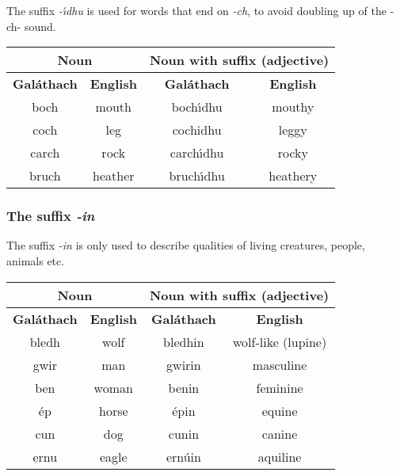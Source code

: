 The suffix \textit{-\'{\i}dhu} is used for words that end on \textit{-ch}, to avoid doubling up of the -ch- sound.
\begin{table}[H]
\centering
\begin{tabular}{cccc}
  \toprule
  \multicolumn{2}{c}{\textbf{Noun}} & \multicolumn{2}{c}{\textbf{Noun with suffix (adjective)}}\\
  \midrule
  \textbf{Gal\'{a}thach} & \textbf{English} & \textbf{Gal\'{a}thach} & \textbf{English}\\
  \cmidrule(lr){1-1}\cmidrule(lr){2-2}\cmidrule(lr){3-3}\cmidrule(lr){4-4}
  boch & mouth & boch\'{\i}dhu & mouthy\\
  coch & leg & cochidhu & leggy\\
  carch & rock & carch\'{\i}dhu & rocky\\
  bruch & heather & bruch\'{\i}dhu & heathery\\
  \bottomrule
\end{tabular}
\label{examples_suffix_iidhu}
\end{table}

\subsubsection{The suffix \textit{-in}}

The suffix \textit{-in} is only used to describe qualities of living creatures, people, animals etc.
\begin{table}[H]
\centering
\begin{tabular}{cccc}
  \toprule
  \multicolumn{2}{c}{\textbf{Noun}} & \multicolumn{2}{c}{\textbf{Noun with suffix (adjective)}}\\
  \midrule
  \textbf{Gal\'{a}thach} & \textbf{English} & \textbf{Gal\'{a}thach} & \textbf{English}\\
  \cmidrule(lr){1-1}\cmidrule(lr){2-2}\cmidrule(lr){3-3}\cmidrule(lr){4-4}
  bledh & wolf & bledhin & wolf-like (lupine)\\
  gwir & man & gwirin & masculine\\
  ben & woman & benin & feminine\\
  \'{e}p & horse & \'{e}pin & equine\\
  cun & dog & cunin & canine\\
  ernu & eagle & ern\'{u}in & aquiline\\
  \bottomrule
\end{tabular}
\label{examples_suffix_in}
\end{table}

